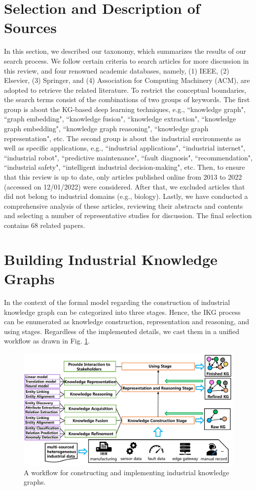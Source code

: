 \documentclass[11pt]{article}
\begin{document}
\section{Selection and Description of Sources} \label{sec2}
\par{In this section, we described our taxonomy, which summarizes the results of our search process.
We follow certain criteria to search articles for more discussion in this review, and four renowned academic databases, namely, (1) IEEE, (2) Elsevier, (3) Springer, and (4) Association for Computing Machinery (ACM), are adopted to retrieve the related literature.
To restrict the conceptual boundaries, the search terms consist of the combinations of two groups of keywords.
The first group is about the KG-based deep learning techniques, e.g., ``knowledge graph", ``graph embedding", ``knowledge fusion", ``knowledge extraction", ``knowledge graph embedding", ``knowledge graph reasoning", ``knowledge graph representation", etc.
The second group is about the industrial environments as well as specific applications, e.g., ``industrial applications", ``industrial internet", ``industrial robot", ``predictive maintenance", ``fault diagnosis", ``recommendation", ``industrial safety", ``intelligent industrial decision-making", etc.
Then, to ensure that this review is up to date, only articles published online from 2013 to 2022 (accessed on 12/01/2022) were considered.
After that, we excluded articles that did not belong to industrial domains (e.g., biology).
Lastly, we have conducted a comprehensive analysis of these articles, reviewing their abstracts and contents and selecting a number of representative studies for discussion.
The final selection contains 68 related papers.}

\section{Building Industrial Knowledge Graphs}\label{sec3}
\par{In the context of the formal model regarding the construction of industrial knowledge graph can be categorized into three stages.
Hence, the IKG process can be enumerated as knowledge construction, representation and reasoning, and using stages.
Regardless of the implemented details, we cast them in a unified workflow as drawn in Fig. \ref{framework}.}


\begin{figure}[htbp]
	\centering
	\includegraphics[width=0.7\linewidth]{submissions/industrial-kg/framework.pdf}
	\caption{A workflow for constructing and implementing industrial knowledge graphs.}
	\label{framework}
\end{figure}
\end{document}
